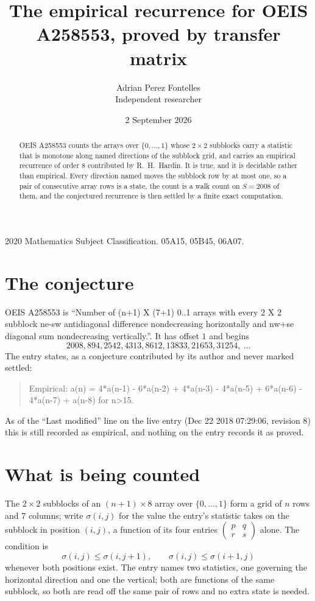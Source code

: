 \documentclass[11pt,a4paper]{article}
\title{The empirical recurrence for OEIS A258553, proved by transfer matrix}
\author{Adrian Perez Fontelles\\ \small Independent researcher}
\date{2 September 2026}
\theoremstyle{plain}
\theoremstyle{definition}
\begin{document}
\maketitle

\begin{abstract}
OEIS A258553 counts the arrays over $\{0,\dots,1\}$ whose $2\times2$ subblocks carry a
statistic that is monotone along named directions of the subblock grid, and carries an
empirical recurrence of order $8$ contributed by R.~H.~Hardin. It is true, and it is
decidable rather than empirical. Every direction named moves the subblock row by at most one,
so a pair of consecutive array rows is a state, the count is a walk count on $S=2008$ of them,
and the conjectured recurrence is then settled by a finite exact computation.
\end{abstract}

\noindent\small 2020 Mathematics Subject Classification. 05A15, 05B45, 06A07.\normalsize

\section{The conjecture}

OEIS A258553 is ``Number of (n+1) X (7+1) 0..1 arrays with every 2 X 2 subblock ne-sw antidiagonal difference nondecreasing horizontally and nw+se diagonal sum nondecreasing vertically.''. It has offset $1$ and begins
\[
2008, 894, 2542, 4313, 8612, 13833, 21653, 31254,\ \dots
\]
The entry states, as a conjecture contributed by its author and never marked settled:
\begin{quote}
Empirical: a(n) = 4*a(n-1) - 6*a(n-2) + 4*a(n-3) - 4*a(n-5) + 6*a(n-6) - 4*a(n-7) + a(n-8) for n>15.
\end{quote}
As of the ``Last modified'' line on the live entry (Dec 22 2018 07:29:06, revision 8) this is still
recorded as empirical, and nothing on the entry records it as proved.

\section{What is being counted}

The $2\times2$ subblocks of an $(n+1)\times8$ array over $\{0,\dots,1\}$ form a grid
of $n$ rows and $7$ columns; write $\sigma(i,j)$ for the value the entry's statistic takes on
the subblock in position $(i,j)$, a function of its four entries
$\begin{pmatrix}p&q\\r&s\end{pmatrix}$ alone. The condition is
\[
\sigma(i,j)\le\sigma(i,j+1),\qquad \sigma(i,j)\le\sigma(i+1,j)
\]
whenever both positions exist. The entry names two statistics, one governing the horizontal direction and one the vertical; both are functions of the same subblock, so both are read off the same pair of rows and no extra state is needed.
\end{document}
